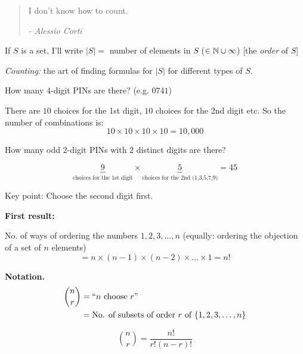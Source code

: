 \documentclass[twoside]{scrartcl}
\begin{document}
\begin{quote}
I don't know how to count. \begin{flushright}
      \textit{ -  Alessio Corti}
       \end{flushright} 
\end{quote} \vspace*{5pt}


If $S$ is a set, I'll write $|S| = $ number of elements in $S$ ($\in\mathbb{N} \cup \infty$) [the \emph{order} of $S$]

\emph{Counting:} the art of finding formulas for $|S|$ for different types of $S$.\\ 


\begin{example}
How many $4$-digit PINs are there? (e.g. $0741$)

There are $10$ choices for the 1st digit, $10$ choices for the 2nd digit etc. So the number of combinations is:
\[10 \times 10 \times 10 \times 10 = 10,000\]	
\end{example}\vspace*{5pt}

\begin{example}
How many odd $2$-digit PINs with $2$ distinct digits are there? 	

\[\underbrace{9}_{\text{choices for the 1st digit}} \times \underbrace{5}_{\text{choices for the 2nd (1,3,5,7,9)}} = 45\]

Key point: Choose the second digit first. 
\end{example}


\textbf{First result:}

No. of ways of ordering the numbers $1,2,3,\dots,n$ (equally: ordering the objection of a set of $n$ elements) 
\[ = n \times (n-1) \times (n-2) \times \dots \times 1 = n!\]





\textbf{Notation.} 
\[
\begin{aligned}
\binom{n}{r} &= ``n \text{ choose } r"\\
  &= \mbox{No. of subsets of order $r$ of } \{1,2,3,\dots,n\}
\end{aligned}
\]

\begin{proposition}
\[\binom{n}{r}= \frac{n!}{r!(n-r)!}
\]	
\end{proposition}
\end{document}
